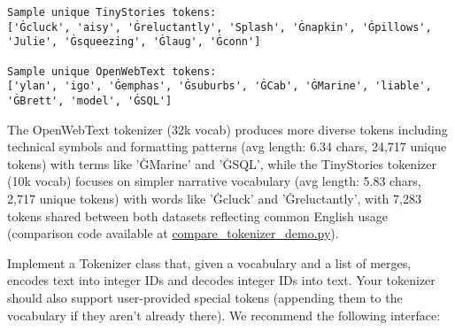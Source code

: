 \begin{enumerate}[label=(\alph*)]
\begin{lstlisting}
Sample unique TinyStories tokens:
['Ġcluck', 'aisy', 'Ġreluctantly', 'Splash', 'Ġnapkin', 'Ġpillows', 'Julie', 'Ġsqueezing', 'Ġlaug', 'Ġconn']

Sample unique OpenWebText tokens:
['ylan', 'igo', 'Ġemphas', 'Ġsuburbs', 'ĠCab', 'ĠMarine', 'liable', 'ĠBrett', 'model', 'ĠSQL']
    \end{lstlisting}
    \begin{answer}
    The OpenWebText tokenizer (32k vocab) produces more diverse tokens including technical symbols and formatting patterns (avg length: 6.34 chars, 24,717 unique tokens) with terms like 'ĠMarine' and 'ĠSQL', while the TinyStories tokenizer (10k vocab) focuses on simpler narrative vocabulary (avg length: 5.83 chars, 2,717 unique tokens) with words like 'Ġcluck' and 'Ġreluctantly', with 7,283 tokens shared between both datasets reflecting common English usage (comparison code available at \href{https://github.com/donglinkang2021/cs336-assignment1-basics/blob/main/data_utils/compare_tokenizer_demo.py}{compare\_tokenizer\_demo.py}).
    \end{answer}
\end{enumerate}



Implement a Tokenizer class that, given a vocabulary and a list of merges, encodes text into integer IDs and decodes integer IDs into text. Your tokenizer should also support user-provided special tokens (appending them to the vocabulary if they aren't already there). We recommend the following interface:

